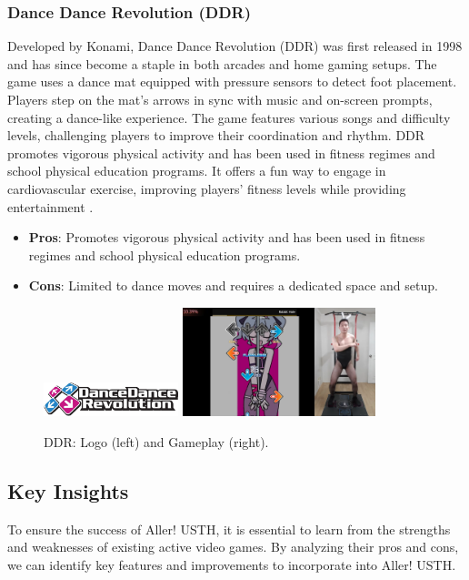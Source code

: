 \documentclass[12pt]{article}
\begin{document}
\subsubsection{Dance Dance Revolution (DDR)}
Developed by Konami, Dance Dance Revolution (DDR) was first released in 1998 and has since become a staple in both arcades and home gaming setups. The game uses a dance mat equipped with pressure sensors to detect foot placement. Players step on the mat's arrows in sync with music and on-screen prompts, creating a dance-like experience. The game features various songs and difficulty levels, challenging players to improve their coordination and rhythm. DDR promotes vigorous physical activity and has been used in fitness regimes and school physical education programs. It offers a fun way to engage in cardiovascular exercise, improving players’ fitness levels while providing entertainment \cite{ddr2017}.
\begin{itemize}
\item \textbf{Pros}: Promotes vigorous physical activity and has been used in fitness regimes and school physical education programs.
\item \textbf{Cons}: Limited to dance moves and requires a dedicated space and setup.
\end{itemize}
\begin{figure}[h]
\centering
\includegraphics[width=0.35\textwidth]{logo-ddr.jpg}
\includegraphics[width=0.5\textwidth]{market-ddr.png}
\caption{DDR: Logo (left) and Gameplay (right).}
\end{figure}

\subsection{Key Insights}
\hspace*{1.5em}To ensure the success of Aller! USTH, it is essential to learn from the strengths and weaknesses of existing active video games.
By analyzing their pros and cons, we can identify key features and improvements to incorporate into Aller! USTH.\\
\end{document}

